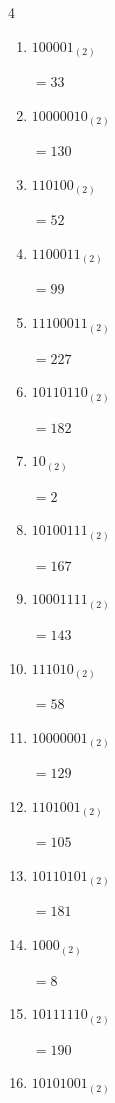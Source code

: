 \begin{multicols}{4}
\begin{enumerate}
        $=165$

  \item $100001_{(2)}$

        $=33$

  \item $10000010_{(2)}$

        $=130$

  \item $110100_{(2)}$

        $=52$

  \item $1100011_{(2)}$

        $=99$

  \item $11100011_{(2)}$

        $=227$

  \item $10110110_{(2)}$

        $=182$

  \item $10_{(2)}$

        $=2$

  \item $10100111_{(2)}$

        $=167$

  \item $10001111_{(2)}$

        $=143$

  \item $111010_{(2)}$

        $=58$

  \item $10000001_{(2)}$

        $=129$

  \item $1101001_{(2)}$

        $=105$

  \item $10110101_{(2)}$

        $=181$

\columnbreak %

\resetques

  \item $1000_{(2)}$

        $=8$

  \item $10111110_{(2)}$

        $=190$

  \item $10101001_{(2)}$


\end{enumerate}
\end{multicols}
